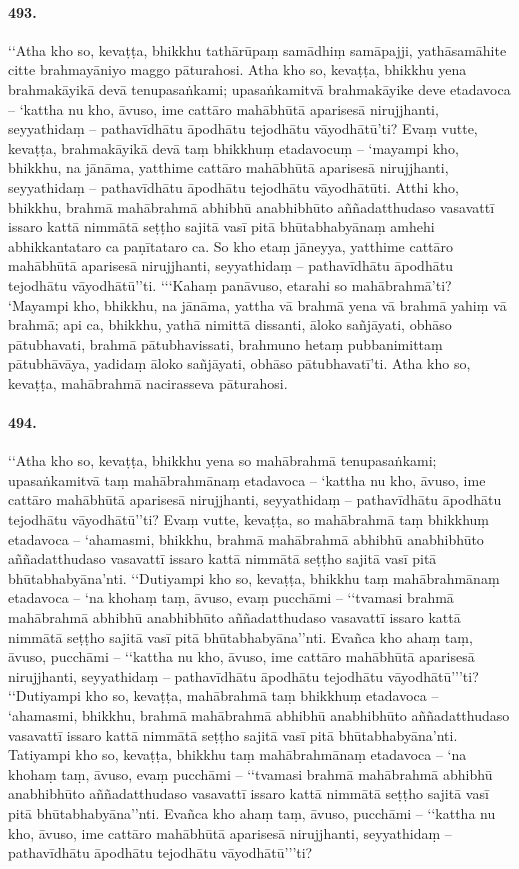 \paragraph{493.} ‘‘Atha kho so, kevaṭṭa, bhikkhu tathārūpaṃ samādhiṃ samāpajji, yathāsamāhite citte brahmayāniyo maggo pāturahosi. Atha kho so, kevaṭṭa, bhikkhu yena brahmakāyikā devā tenupasaṅkami; upasaṅkamitvā brahmakāyike deve etadavoca – ‘kattha nu kho, āvuso, ime cattāro mahābhūtā aparisesā nirujjhanti, seyyathidaṃ – pathavīdhātu āpodhātu tejodhātu vāyodhātū’ti? Evaṃ vutte, kevaṭṭa, brahmakāyikā devā taṃ bhikkhuṃ etadavocuṃ – ‘mayampi kho, bhikkhu, na jānāma, yatthime cattāro mahābhūtā aparisesā nirujjhanti, seyyathidaṃ – pathavīdhātu āpodhātu tejodhātu vāyodhātūti. Atthi kho, bhikkhu, brahmā mahābrahmā abhibhū anabhibhūto aññadatthudaso vasavattī issaro kattā nimmātā seṭṭho sajitā vasī pitā bhūtabhabyānaṃ amhehi abhikkantataro ca paṇītataro ca. So kho etaṃ jāneyya, yatthime cattāro mahābhūtā aparisesā nirujjhanti, seyyathidaṃ – pathavīdhātu āpodhātu tejodhātu vāyodhātū’’ti. ‘‘‘Kahaṃ panāvuso, etarahi so mahābrahmā’ti? ‘Mayampi kho, bhikkhu, na jānāma, yattha vā brahmā yena vā brahmā yahiṃ vā brahmā; api ca, bhikkhu, yathā nimittā dissanti, āloko sañjāyati, obhāso pātubhavati, brahmā pātubhavissati, brahmuno hetaṃ pubbanimittaṃ pātubhāvāya, yadidaṃ āloko sañjāyati, obhāso pātubhavatī’ti. Atha kho so, kevaṭṭa, mahābrahmā nacirasseva pāturahosi.

\paragraph{494.} ‘‘Atha kho so, kevaṭṭa, bhikkhu yena so mahābrahmā tenupasaṅkami; upasaṅkamitvā taṃ mahābrahmānaṃ etadavoca – ‘kattha nu kho, āvuso, ime cattāro mahābhūtā aparisesā nirujjhanti, seyyathidaṃ – pathavīdhātu āpodhātu tejodhātu vāyodhātū’’ti? Evaṃ vutte, kevaṭṭa, so mahābrahmā taṃ bhikkhuṃ etadavoca – ‘ahamasmi, bhikkhu, brahmā mahābrahmā abhibhū anabhibhūto aññadatthudaso vasavattī issaro kattā nimmātā seṭṭho sajitā vasī pitā bhūtabhabyāna’nti. ‘‘Dutiyampi kho so, kevaṭṭa, bhikkhu taṃ mahābrahmānaṃ etadavoca – ‘na khohaṃ taṃ, āvuso, evaṃ pucchāmi – ‘‘tvamasi brahmā mahābrahmā abhibhū anabhibhūto aññadatthudaso vasavattī issaro kattā nimmātā seṭṭho sajitā vasī pitā bhūtabhabyāna’’nti. Evañca kho ahaṃ taṃ, āvuso, pucchāmi – ‘‘kattha nu kho, āvuso, ime cattāro mahābhūtā aparisesā nirujjhanti, seyyathidaṃ – pathavīdhātu āpodhātu tejodhātu vāyodhātū’’’ti? ‘‘Dutiyampi kho so, kevaṭṭa, mahābrahmā taṃ bhikkhuṃ etadavoca – ‘ahamasmi, bhikkhu, brahmā mahābrahmā abhibhū anabhibhūto aññadatthudaso vasavattī issaro kattā nimmātā seṭṭho sajitā vasī pitā bhūtabhabyāna’nti. Tatiyampi kho so, kevaṭṭa, bhikkhu taṃ mahābrahmānaṃ etadavoca – ‘na khohaṃ taṃ, āvuso, evaṃ pucchāmi – ‘‘tvamasi brahmā mahābrahmā abhibhū anabhibhūto aññadatthudaso vasavattī issaro kattā nimmātā seṭṭho sajitā vasī pitā bhūtabhabyāna’’nti. Evañca kho ahaṃ taṃ, āvuso, pucchāmi – ‘‘kattha nu kho, āvuso, ime cattāro mahābhūtā aparisesā nirujjhanti, seyyathidaṃ – pathavīdhātu āpodhātu tejodhātu vāyodhātū’’’ti?


